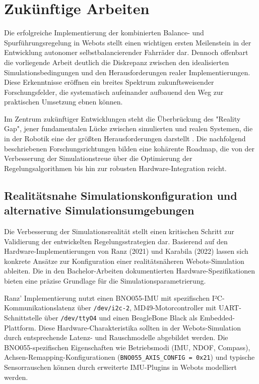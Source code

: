 \section{Zukünftige Arbeiten}

Die erfolgreiche Implementierung der kombinierten Balance- und Spurführungsregelung in Webots stellt einen wichtigen 
ersten Meilenstein in der Entwicklung autonomer selbstbalancierender Fahrräder dar. Dennoch offenbart die vorliegende Arbeit 
deutlich die Diskrepanz zwischen den idealisierten Simulationsbedingungen und den Herausforderungen realer Implementierungen. 
Diese Erkenntnisse eröffnen ein breites Spektrum zukunftsweisender Forschungsfelder, die systematisch aufeinander aufbauend 
den Weg zur praktischen Umsetzung ebnen können.

Im Zentrum zukünftiger Entwicklungen steht die Überbrückung des "Reality Gap", jener fundamentalen Lücke zwischen 
simulierten und realen Systemen, die in der Robotik eine der größten Herausforderungen darstellt \citep{jakobi1995reality}. 
Die nachfolgend beschriebenen Forschungsrichtungen bilden eine kohärente Roadmap, die von der Verbesserung der 
Simulationstreue über die Optimierung der Regelungsalgorithmen bis hin zur robusten Hardware-Integration reicht.

\subsection{Realitätsnahe Simulationskonfiguration und alternative Simulationsumgebungen}

Die Verbesserung der Simulationsrealität stellt einen kritischen Schritt zur Validierung der entwickelten Regelungsstrategien 
dar. Basierend auf den Hardware-Implementierungen von Ranz (2021) und Karabila (2022) lassen sich konkrete Ansätze zur 
Konfiguration einer realitätsnäheren Webots-Simulation ableiten. Die in den Bachelor-Arbeiten dokumentierten 
Hardware-Spezifikationen bieten eine präzise Grundlage für die Simulationsparametrierung.

Ranz' Implementierung nutzt einen BNO055-IMU mit spezifischen I²C-Kommunikationslatenz über \texttt{/dev/i2c-2}, 
MD49-Motorcontroller mit UART-Schnittstelle über \texttt{/dev/ttyO4} und einen BeagleBone Black als Embedded-Plattform. 
Diese Hardware-Charakteristika sollten in der Webots-Simulation durch entsprechende Latenz- und Rauschmodelle abgebildet 
werden. Die BNO055-spezifischen Eigenschaften wie Betriebsmodi (IMU, NDOF, Compass), Achsen-Remapping-Konfigurationen 
(\texttt{BNO055\_AXIS\_CONFIG = 0x21}) und typische Sensorrauschen können durch erweiterte IMU-Plugins in Webots modelliert werden.

